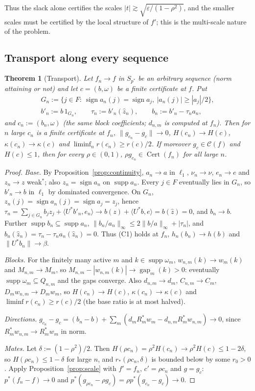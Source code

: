\documentclass[10pt]{amsart}
\newtheorem{theorem}{Theorem}[section]
\theoremstyle{definition}
\theoremstyle{remark}
\newcommand{\supp}{\operatorname{supp}}
\newcommand{\sgn}{\operatorname{sign}}
\newcommand{\Cset}{\mathcal C}
\newcommand{\Cert}{\operatorname{Cert}}
\newcommand{\gap}{\operatorname{gap}}
\newcommand{\zh}{\hat z}
\newcommand{\ip}[2]{\langle #1,#2\rangle}
\begin{document}
Thus the slack alone certifies the scales $|t|\gtrsim\sqrt{\varepsilon/(1-
\rho^2)}$, and the smaller scales must be certified by the local structure
of $f'$; this is the multi-scale nature of the problem.

\subsection{Transport along every sequence}

\begin{theorem}[Transport]\label{thm:transport}
Let $f_n\to f$ in $S_{p^*}$ be an arbitrary sequence \textup{(}norm
attaining or not\textup{)} and let $c=(b,\omega)$ be a finite certificate
at $f$.  Put
\begin{gather*}
 G_n:=\{j\in F:\ \sgn a_n(j)=\sgn a_j,\ |a_n(j)|\ge|a_j|/2\},\\
 b'_n:=b\,1_{G_n},\qquad \tau_n:=b'_n(\zh_n),\qquad b_n:=b'_n-\tau_na_n,
\end{gather*}
and $c_n:=(b_n,\omega)$ \textup{(}the same block coefficients; $d_{n,m}$ is
computed at $f_n$\textup{)}.  Then for $n$ large $c_n$ is a finite
certificate at $f_n$, $\|g_{c_n}-g_c\|\to0$, $H(c_n)\to H(c)$,
$\kappa(c_n)\to\kappa(c)$ and $\liminf_nr(c_n)\ge r(c)/2$.  If moreover
$g_c\in\Cset(f)$ and $H(c)\le1$, then for every $\rho\in(0,1)$,
$\rho g_{c_n}\in\Cert(f_n)$ for all large $n$.
\end{theorem}

\begin{proof}
\emph{Base.}  By Proposition~\ref{prop:continuity}, $a_n\to a$ in $\ell_1$,
$\nu_n\to\nu$, $e_n\to e$ and $z_n\to z$ weak$^*$; also $z_n=\sgn a_n$ on
$\supp a_n$.  Every $j\in F$ eventually lies in $G_n$, so $b'_n\to b$ in
$\ell_1$ by dominated convergence.  On $G_n$,
$z_n(j)=\sgn a_n(j)=\sgn a_j=z_j$, hence
$\tau_n=\sum_{j\in G_n}b_jz_j+\ip{U^*b'_n}{e_n}\to b(z)+\ip{U^*b}{e}=
b(\zh)=0$, and $b_n\to b$.  Further $\supp b_n\subseteq\supp a_n$,
$\|b_n/a_n\|_\infty\le2\|b/a\|_\infty+|\tau_n|$, and
$b_n(\zh_n)=\tau_n-\tau_na_n(\zh_n)=0$.  Thus (C1) holds at $f_n$,
$h_n(b_n)\to h(b)$ and $\|U^*b_n\|\to\beta$.

\emph{Blocks.}  For the finitely many active $m$ and $k\in\supp\omega_m$,
$w_{n,m}(k)\to w_m(k)$ and $M_{n,m}\to M_m$, so
$M_{n,m}-|w_{n,m}(k)|\to\gap_m(k)>0$: eventually $\supp\omega_m\subseteq
Q_{n,m}$ and the gaps converge.  Also $d_{n,m}\to d_m$, $C_{n,m}\to C_m$,
$D_mw_{n,m}\to D_mw_m$, so $H(c_n)\to H(c)$, $\kappa(c_n)\to\kappa(c)$ and
$\liminf r(c_n)\ge r(c)/2$ (the base ratio is at most halved).

\emph{Directions.}  $g_{c_n}-g_c=(b_n-b)+\sum_m(d_mR_m^*w_m-d_{n,m}R_m^*w_{n,m})
\to0$, since $R_m^*w_{n,m}\to R_m^*w_m$ in norm.

\emph{Mates.}  Let $\delta:=(1-\rho^2)/2$.  Then $H(\rho c_n)=\rho^2H(c_n)
\to\rho^2H(c)\le1-2\delta$, so $H(\rho c_n)\le1-\delta$ for large $n$, and
$r_*(\rho c_n,\delta)$ is bounded below by some $r_0>0$.  Apply
Proposition~\ref{prop:scale} with $f'=f_n$, $c'=\rho c_n$ and $g=g_c$:
$p^*(f_n-f)\to0$ and $p^*(g_{\rho c_n}-\rho g_c)=\rho p^*(g_{c_n}-g_c)\to0$.
\end{proof}
\end{document}
